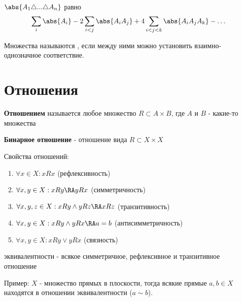 \documentclass[a4paper, 14pt]{article}
\begin{document}
    \begin{theorem}
        $  \abs{A_1 \triangle ... \triangle A_n} $ равно
        \[
        \sum_i  \abs{A_i} -
        2\sum_{i<j} \abs{A_iA_j} +
        4\sum_{i<j<k} \abs{A_iA_jA_k} - \dots
        \]
    \end{theorem}
    
    \begin{definition}
        Множества называются {}, если между ними можно
        установить взаимно-однозначное соответствие.
    \end{definition}

    \section{Отношения}
    \begin{definition}
        {\bf Отношением} называется любое множество 
        $R \subset A \times B$, где $A$ и $B$ - какие-то множества
    \end{definition}
    \begin{definition}
        {\bf Бинарное отношение} - отношение вида $R \subset X \times X$
    \end{definition}

    Свойства отношений:
    \begin{enumerate}
        \item $\forall x \in X: xRx$ (рефлексивность)
        \item $\forall x,y \in X: xRy \RA  yRx$ (симметричность)
        \item $\forall x,y,z \in X: xRy \land yRz \RA xRz$ (транзитивность)
        \item $\forall x,y \in X: xRy \land yRx \RA a = b$ (антисимметричность)
        \item $\forall x,y \in X: xRy \lor yRx$ (связность)
    \end{enumerate}

    \begin{definition}
        { эквивалентности} - всякое симметричное, рефлексивное и транзитивное отношение
    \end{definition}
    Пример: $X$ - множество прямых в плоскости, тогда всякие прямые $a, b \in X$
    находятся в отношении эквивалентности ($a \sim b$).\\
\end{document}
